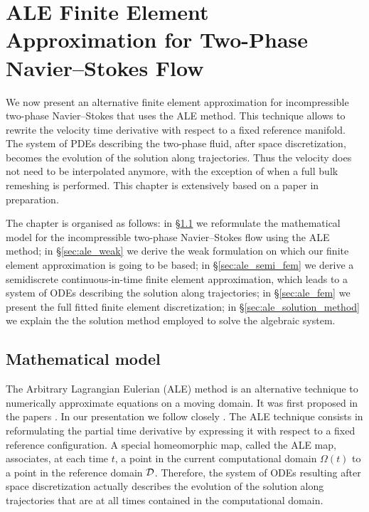 \chapter[Two-Phase Navier--Stokes Flow ALE FEM]
{\sc ALE Finite Element Approximation for Two-Phase Navier--Stokes Flow}
\label{ch:ale}
We now present an alternative finite element approximation for incompressible
two-phase Navier--Stokes that uses the ALE method. This technique allows to
rewrite the velocity time derivative with respect to a fixed reference
manifold. The system of PDEs describing the two-phase fluid,
after space discretization,
becomes the evolution of the solution along trajectories. Thus the velocity
does not need to be interpolated anymore, with the exception of when a full
bulk remeshing is performed. This chapter is extensively based on a paper in
preparation.

The chapter is organised as follows: in \S\ref{sec:ale_model} we reformulate the
mathematical model for the incompressible two-phase Navier--Stokes flow using
the ALE method; in \S\ref{sec:ale_weak} we derive the weak formulation on
which our finite element approximation is going to be based; in
\S\ref{sec:ale_semi_fem} we derive a semidiscrete continuous-in-time finite
element approximation, which leads to a system of ODEs describing the solution
along trajectories; in \S\ref{sec:ale_fem} we present the full fitted finite
element discretization; in \S\ref{sec:ale_solution_method} we explain the
the solution method employed to solve the algebraic system.

\section{Mathematical model}\label{sec:ale_model}
The Arbitrary Lagrangian Eulerian (ALE) method is an alternative technique to
numerically approximate equations on a moving domain. It was first proposed in
the papers \cite{Donea83,Hughes81}. In our presentation we follow closely
\cite{Nobile99,Formaggia04,NobilePhd}. The ALE technique consists in
reformulating
the partial time derivative by expressing it with respect to a fixed reference
configuration. A special homeomorphic map, called the ALE map, associates, at
each time $t$, a point in the current computational domain $\Omega(t)$ to a
point in the reference domain $\mathcal D$. Therefore, the system of ODEs resulting
after space discretization actually describes the evolution of the solution
along trajectories that are at all times contained in the computational domain.

